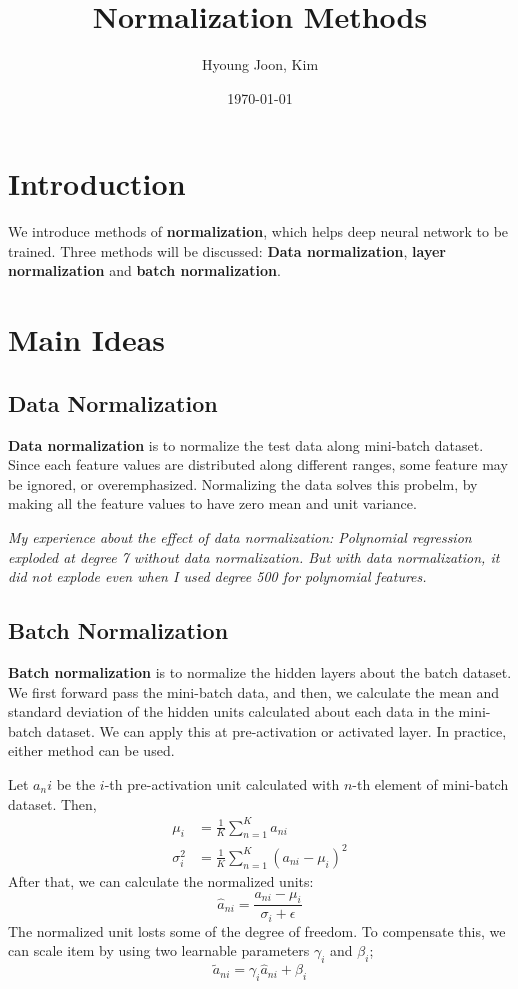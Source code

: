 \documentclass{article}
\title{Normalization Methods}
\author{Hyoung Joon, Kim}
\date{\today}
\begin{document}
\maketitle
\tableofcontents
\newpage

\section{Introduction}
    We introduce methods of \textbf{normalization}, which helps deep neural network to be trained.
    Three methods will be discussed: \textbf{Data normalization}, 
    \textbf{layer normalization} and \textbf{batch normalization}.

\section{Main Ideas}
    \subsection{Data Normalization}
        \textbf{Data normalization} is to normalize the test data along mini-batch dataset.
        Since each feature values are distributed along different ranges,
        some feature may be ignored, or overemphasized. Normalizing the data solves this probelm, by
        making all the feature values to have zero mean and unit variance.
        
        \emph{My experience about the effect of data normalization:
        Polynomial regression exploded at degree 7 without data normalization.
        But with data normalization, it did not explode even when I used degree 500 for polynomial features.}

    \subsection{Batch Normalization}
        \textbf{Batch normalization} is to normalize the hidden layers about the batch dataset.
        We first forward pass the mini-batch data, and then, we calculate the mean and standard
        deviation of the hidden units calculated about each data in the mini-batch dataset.
        We can apply this at pre-activation or activated layer. In practice, either method can be used.

        Let $a_ni$ be the $i$-th pre-activation unit calculated with $n$-th element of mini-batch dataset.
        Then,
        \begin{align}
            \mu_i &= \frac{1}{K}\sum_{n=1}^{K}a_{ni} \\
            \sigma_i^2 &= \frac{1}{K}\sum_{n=1}^{K}(a_{ni}-\mu_i)^2
        \end{align}
        After that, we can calculate the normalized units: 
        \[
        \hat{a}_{ni} = \frac{a_{ni}-\mu_i}{\sigma_i + \epsilon}
        \]
        The normalized unit losts some of the degree of freedom. To compensate this, we can scale item
        by using two learnable parameters $\gamma_i$ and $\beta_i$;
        \[
        \tilde{a}_{ni} = \gamma_i \hat{a}_{ni} + \beta_i
        \]
\end{document}
